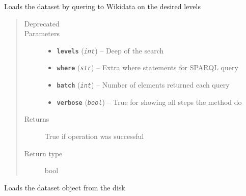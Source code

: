 \documentclass[letterpaper,10pt,english]{sphinxmanual}
\begin{document}
\begin{fulllineitems}
\begin{fulllineitems}
\begin{quote}
\begin{description}
\end{description}\end{quote}

\end{fulllineitems}


\begin{fulllineitems}
\label{index:dataset.Dataset.load_entire_dataset}
Loads the dataset by quering to Wikidata on the desired levels
\begin{quote}\begin{description}
\item[{Deprecated}] \leavevmode
\item[{Parameters}] \leavevmode\begin{itemize}
\item {} 
\textbf{\texttt{levels}} (\emph{\texttt{int}}) -- Deep of the search

\item {} 
\textbf{\texttt{where}} (\emph{\texttt{str}}) -- Extra where statements for SPARQL query

\item {} 
\textbf{\texttt{batch}} (\emph{\texttt{int}}) -- Number of elements returned each query

\item {} 
\textbf{\texttt{verbose}} (\emph{\texttt{bool}}) -- True for showing all steps the method do

\end{itemize}

\item[{Returns}] \leavevmode
True if operation was successful

\item[{Return type}] \leavevmode
bool

\end{description}\end{quote}

\end{fulllineitems}


\begin{fulllineitems}
\label{index:dataset.Dataset.load_from_binary}
Loads the dataset object from the disk


\end{fulllineitems}
\end{fulllineitems}
\end{document}
